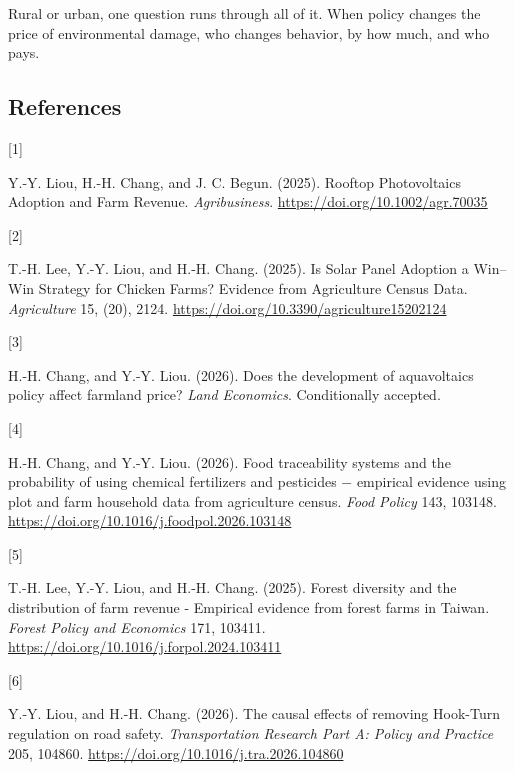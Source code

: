 \documentclass[
  11pt,
]{article}
\newlength{\cslhangindent}
\newlength{\csllabelwidth}
\newenvironment{CSLReferences}[2] %
 {\begin{list}{}{%
  \setlength{\itemindent}{0pt}
  \setlength{\leftmargin}{0pt}
  \setlength{\parsep}{0pt}
  \ifodd #1
   \setlength{\leftmargin}{\cslhangindent}
   \setlength{\itemindent}{-1\cslhangindent}
  \fi
  \setlength{\itemsep}{#2\baselineskip}}}
 {\end{list}}
\newcommand{\CSLLeftMargin}[1]{\parbox[t]{\csllabelwidth}{\strut#1\strut}}
\newcommand{\CSLRightInline}[1]{\parbox[t]{\linewidth - \csllabelwidth}{\strut#1\strut}}
\begin{document}
Rural or urban, one question runs through all of it. When policy changes
the price of environmental damage, who changes behavior, by how much,
and who pays.

\newpage

\subsection*{References}\label{references}

\protect{}\label{refs}
\begin{CSLReferences}{0}{0}
\CSLLeftMargin{{[}1{]} }%
\CSLRightInline{Y.-Y. Liou, H.-H. Chang, and J. C. Begun. (2025).
{Rooftop Photovoltaics Adoption and Farm Revenue}. \emph{Agribusiness}.
\url{https://doi.org/10.1002/agr.70035}}

\CSLLeftMargin{{[}2{]} }%
\CSLRightInline{T.-H. Lee, Y.-Y. Liou, and H.-H. Chang. (2025). {Is
Solar Panel Adoption a Win--Win Strategy for Chicken Farms? Evidence
from Agriculture Census Data}. \emph{Agriculture} 15, (20), 2124.
\url{https://doi.org/10.3390/agriculture15202124}}

\CSLLeftMargin{{[}3{]} }%
\CSLRightInline{H.-H. Chang, and Y.-Y. Liou. (2026). Does the
development of aquavoltaics policy affect farmland price? \emph{Land
Economics}. Conditionally accepted.}

\CSLLeftMargin{{[}4{]} }%
\CSLRightInline{H.-H. Chang, and Y.-Y. Liou. (2026). Food traceability
systems and the probability of using chemical fertilizers and pesticides
− empirical evidence using plot and farm household data from agriculture
census. \emph{Food Policy} 143, 103148.
\url{https://doi.org/10.1016/j.foodpol.2026.103148}}

\CSLLeftMargin{{[}5{]} }%
\CSLRightInline{T.-H. Lee, Y.-Y. Liou, and H.-H. Chang. (2025). Forest
diversity and the distribution of farm revenue - {E}mpirical evidence
from forest farms in {T}aiwan. \emph{Forest Policy and Economics} 171,
103411. \url{https://doi.org/10.1016/j.forpol.2024.103411}}

\CSLLeftMargin{{[}6{]} }%
\CSLRightInline{Y.-Y. Liou, and H.-H. Chang. (2026). The causal effects
of removing {Hook-Turn} regulation on road safety. \emph{Transportation
Research Part A: Policy and Practice} 205, 104860.
\url{https://doi.org/10.1016/j.tra.2026.104860}}


\end{CSLReferences}
\end{document}
